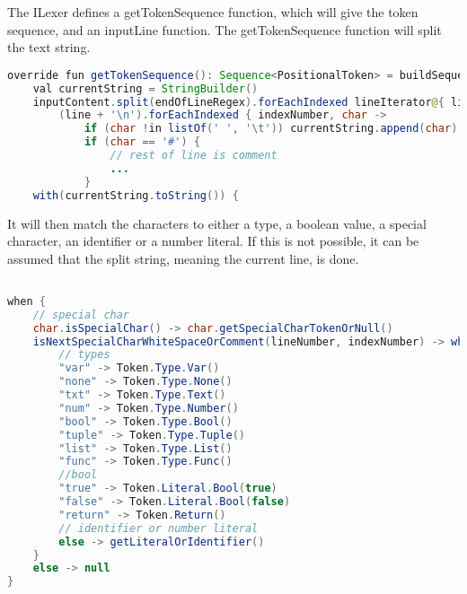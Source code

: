 The ILexer defines a getTokenSequence function, which will give the token sequence, and an inputLine function.
The getTokenSequence function will split the text string.
\begin{lstlisting}[language=java,label=lis:LexerStringSplit,caption=The string is being split and new lines are added to the string .,firstnumber=8]
override fun getTokenSequence(): Sequence<PositionalToken> = buildSequence {
	val currentString = StringBuilder()
	inputContent.split(endOfLineRegex).forEachIndexed lineIterator@{ lineNumber, line ->
		(line + '\n').forEachIndexed { indexNumber, char ->
			if (char !in listOf(' ', '\t')) currentString.append(char)
			if (char == '#') {
				// rest of line is comment
				...
			}
	with(currentString.toString()) {
\end{lstlisting}		
It will then match the characters to either a type, a boolean value, a special character, an identifier or a number literal.
If this is not possible, it can be assumed that the split string, meaning the current line, is done.
\begin{lstlisting}[language=java,label=lis:LexerStringMatcher,caption=The split string is being matched to a token,firstnumber=19]

when {
	// special char
	char.isSpecialChar() -> char.getSpecialCharTokenOrNull()
	isNextSpecialCharWhiteSpaceOrComment(lineNumber, indexNumber) -> when (this) {
		// types
		"var" -> Token.Type.Var()
		"none" -> Token.Type.None()
		"txt" -> Token.Type.Text()
		"num" -> Token.Type.Number()
		"bool" -> Token.Type.Bool()
		"tuple" -> Token.Type.Tuple()
		"list" -> Token.Type.List()
		"func" -> Token.Type.Func()
		//bool
		"true" -> Token.Literal.Bool(true)
		"false" -> Token.Literal.Bool(false)
		"return" -> Token.Return()
		// identifier or number literal
		else -> getLiteralOrIdentifier()
	}
	else -> null
}
\end{lstlisting}
